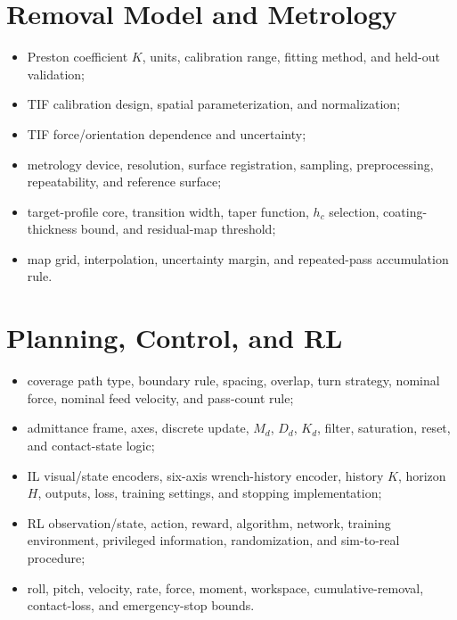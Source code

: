 \section{Removal Model and Metrology}
\begin{itemize}
  \item Preston coefficient \(K\), units, calibration range, fitting method, and held-out validation;
  \item TIF calibration design, spatial parameterization, and normalization;
  \item TIF force/orientation dependence and uncertainty;
  \item metrology device, resolution, surface registration, sampling, preprocessing, repeatability, and reference surface;
  \item target-profile core, transition width, taper function, \(h_c\) selection, coating-thickness bound, and residual-map threshold;
  \item map grid, interpolation, uncertainty margin, and repeated-pass accumulation rule.
\end{itemize}

\section{Planning, Control, and RL}
\begin{itemize}
  \item coverage path type, boundary rule, spacing, overlap, turn strategy, nominal force, nominal feed velocity, and pass-count rule;
  \item admittance frame, axes, discrete update, \(M_d\), \(D_d\), \(K_d\), filter, saturation, reset, and contact-state logic;
  \item IL visual/state encoders, six-axis wrench-history encoder, history \(K\), horizon \(H\), outputs, loss, training settings, and stopping implementation;
  \item RL observation/state, action, reward, algorithm, network, training environment, privileged information, randomization, and sim-to-real procedure;
  \item roll, pitch, velocity, rate, force, moment, workspace, cumulative-removal, contact-loss, and emergency-stop bounds.
\end{itemize}

